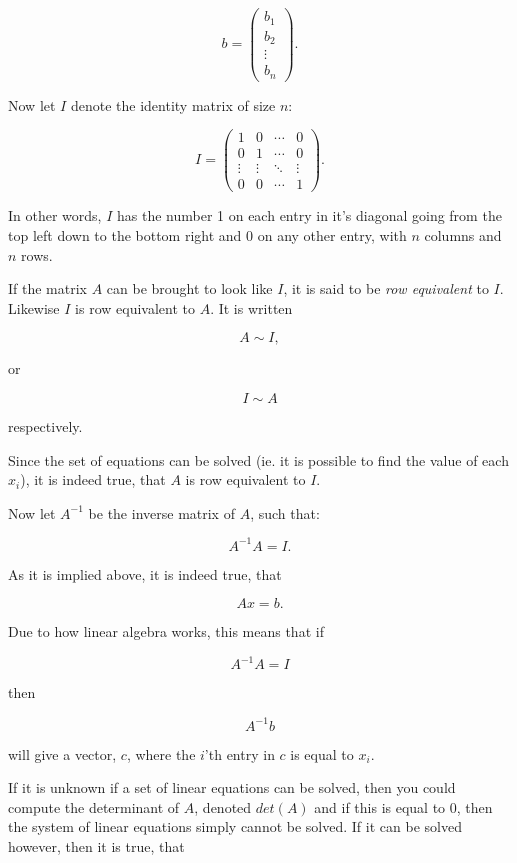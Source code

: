 \documentclass[a4paper]{article}
\begin{document}
$$b =
\begin{pmatrix}
	b_1\\
	b_2\\
	\vdots\\
	b_n
\end{pmatrix}.
$$

Now let $I$ denote the identity matrix of size $n$:

$$I =
\begin{pmatrix}
1 & 0 & \cdots & 0\\
0 & 1 & \cdots & 0\\
\vdots & \vdots & \ddots & \vdots\\
0 & 0 & \cdots & 1
\end{pmatrix}.
$$

\noindent In other words, $I$ has the number 1 on each entry in it's diagonal going from the top left down to the bottom right and 0 on any other entry, with $n$ columns and $n$ rows.

If the matrix $A$ can be brought to look like $I$, it is said to be \emph{row equivalent} to $I$. Likewise $I$ is row equivalent to $A$. It is written

$$A \sim I,$$

\noindent or

$$I \sim A$$

\noindent respectively.

Since the set of equations can be solved (ie. it is possible to find the value of each $x_i$), it is indeed true, that $A$ is row equivalent to $I$.

Now let $A^{-1}$ be the inverse matrix of $A$, such that:

$$A^{-1} A = I.$$

As it is implied above, it is indeed true, that

$$A x = b.$$

Due to how linear algebra works, this means that if

$$A^{-1} A = I$$

\noindent then

$$A^{-1} b$$

\noindent will give a vector, $c$, where the $i$'th entry in $c$ is equal to $x_i$.

If it is unknown if a set of linear equations can be solved, then you could compute the determinant of $A$, denoted $det(A)$ and if this is equal to 0, then the system of linear equations simply cannot be solved. If it can be solved however, then it is true, that
\end{document}
